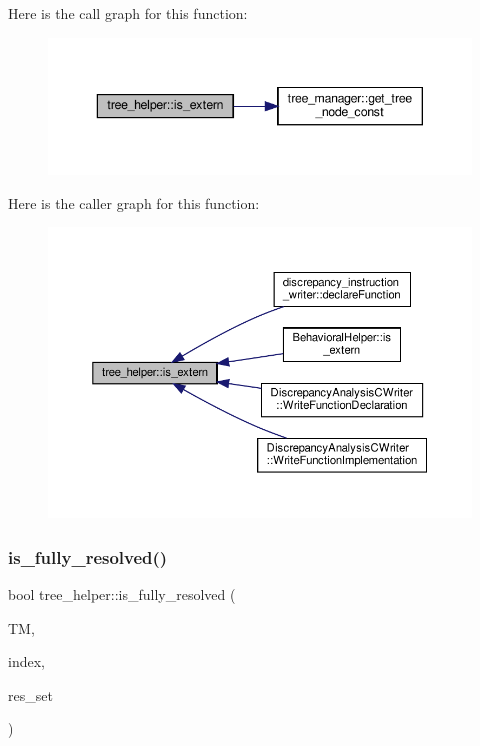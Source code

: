 Here is the call graph for this function\+:
\nopagebreak
\begin{figure}[H]
\begin{center}
\leavevmode
\includegraphics[width=343pt]{d7/d99/classtree__helper_aa13e4e539150602fcb62d284869db494_cgraph}
\end{center}
\end{figure}
Here is the caller graph for this function\+:
\nopagebreak
\begin{figure}[H]
\begin{center}
\leavevmode
\includegraphics[width=350pt]{d7/d99/classtree__helper_aa13e4e539150602fcb62d284869db494_icgraph}
\end{center}
\end{figure}
\mbox{\label{classtree__helper_ab5d77cdf1e25cde59094436d0980cc5a}} 
\subsubsection{\texorpdfstring{is\+\_\+fully\+\_\+resolved()}{is\_fully\_resolved()}}
{\footnotesize\ttfamily bool tree\+\_\+helper\+::is\+\_\+fully\+\_\+resolved (\begin{DoxyParamCaption}\item[{const \hyperlink{tree__manager_8hpp_a792e3f1f892d7d997a8d8a4a12e39346}{tree\+\_\+manager\+Const\+Ref} \&}]{TM,  }\item[{const unsigned int}]{index,  }\item[{\hyperlink{classCustomOrderedSet}{Custom\+Ordered\+Set}$<$ unsigned int $>$ \&}]{res\+\_\+set }\end{DoxyParamCaption})\hspace{0.3cm}{\ttfamily [static]}}



